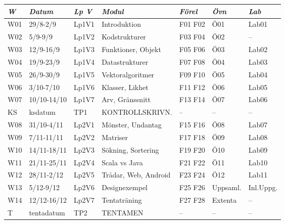 \begin{tabular}{l|l|l|l|l|l|l}
\textit{W} & \textit{Datum} & \textit{Lp V} & \textit{Modul} & \textit{Förel} & \textit{Övn} & \textit{Lab} \\ \hline \hline
W01 & 29/8-2/9    & Lp1V1 & Introduktion         & F01 F02 & Ö01      & Lab01     \\
W02 & 5/9-9/9     & Lp1V2 & Kodstrukturer        & F03 F04 & Ö02      & --        \\
W03 & 12/9-16/9   & Lp1V3 & Funktioner, Objekt   & F05 F06 & Ö03      & Lab02     \\
W04 & 19/9-23/9   & Lp1V4 & Datastrukturer       & F07 F08 & Ö04      & Lab03     \\
W05 & 26/9-30/9   & Lp1V5 & Vektoralgoritmer     & F09 F10 & Ö05      & Lab04     \\
W06 & 3/10-7/10   & Lp1V6 & Klasser, Likhet      & F11 F12 & Ö06      & Lab05     \\
W07 & 10/10-14/10 & Lp1V7 & Arv, Gränssnitt      & F13 F14 & Ö07      & Lab06     \\
KS  & ksdatum     & TP1   & KONTROLLSKRIVN.      & --      & --       & --        \\
W08 & 31/10-4/11  & Lp2V1 & Mönster, Undantag    & F15 F16 & Ö08      & Lab07     \\
W09 & 7/11-11/11  & Lp2V2 & Matriser             & F17 F18 & Ö09      & Lab08     \\
W10 & 14/11-18/11 & Lp2V3 & Sökning, Sortering   & F19 F20 & Ö10      & Lab09     \\
W11 & 21/11-25/11 & Lp2V4 & Scala vs Java        & F21 F22 & Ö11      & Lab10     \\
W12 & 28/11-2/12  & Lp2V5 & Trådar, Web, Android & F23 F24 & Ö12      & Lab11     \\
W13 & 5/12-9/12   & Lp2V6 & Designexempel        & F25 F26 & Uppsaml. & Inl.Uppg. \\
W14 & 12/12-16/12 & Lp2V7 & Tentaträning         & F27 F28 & Extenta  & --        \\
T   & tentadatum  & TP2   & TENTAMEN             & --      & --       & --        \\
\end{tabular}
